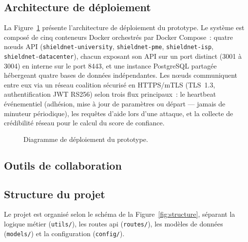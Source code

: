 \subsection{Architecture de déploiement}

La Figure~\ref{fig:deployment} présente l'architecture de déploiement du prototype. Le système est composé de cinq conteneurs Docker orchestrés par Docker Compose~: quatre nœuds API (\texttt{shieldnet-university}, \texttt{shieldnet-pme}, \texttt{shieldnet-isp},\\ \texttt{shieldnet-datacenter}), chacun exposant son API sur un port distinct (3001 à 3004) en interne sur le port 8443, et une instance PostgreSQL partagée hébergeant quatre bases de données indépendantes. Les nœuds communiquent entre eux via un réseau coalition sécurisé en HTTPS/mTLS (TLS~1.3, authentification JWT RS256) selon trois flux principaux~: le heartbeat événementiel (adhésion, mise à jour de paramètres ou départ — jamais de minuteur périodique), les requêtes d'aide lors d'une attaque, et la collecte de crédibilité réseau pour le calcul du score de confiance.

\begin{figure}[H]
\centering
{}
\caption{Diagramme de déploiement du prototype.}
\label{fig:deployment}
\end{figure}

\subsection{Outils de collaboration}



\subsection{Structure du projet}

Le projet est organisé selon le schéma de la Figure~\ref{fig:structure}, séparant la logique métier (\texttt{utils/}), les routes \gls{api} (\texttt{routes/}), les modèles de données (\texttt{models/}) et la configuration (\texttt{config/}).

